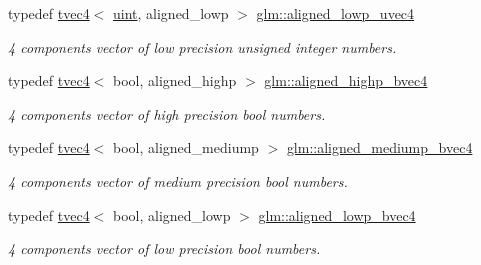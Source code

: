 \begin{DoxyCompactItemize}
\mbox{\label{group__gtc__type__aligned_gaddd52f9fd4fe29220ad183043a7d1ddd}} 
typedef \hyperlink{structglm_1_1tvec4}{tvec4}$<$ \hyperlink{group__core__precision_ga4fd29415871152bfb5abd588334147c8}{uint}, aligned\+\_\+lowp $>$ \hyperlink{group__gtc__type__aligned_gaddd52f9fd4fe29220ad183043a7d1ddd}{glm\+::aligned\+\_\+lowp\+\_\+uvec4}
\begin{DoxyCompactList}\small\item\em 4 components vector of low precision unsigned integer numbers. \end{DoxyCompactList}\item 
\mbox{\label{group__gtc__type__aligned_ga2e41bbaacd4df8babd91b4e2f21cb8dd}} 
typedef \hyperlink{structglm_1_1tvec4}{tvec4}$<$ bool, aligned\+\_\+highp $>$ \hyperlink{group__gtc__type__aligned_ga2e41bbaacd4df8babd91b4e2f21cb8dd}{glm\+::aligned\+\_\+highp\+\_\+bvec4}
\begin{DoxyCompactList}\small\item\em 4 components vector of high precision bool numbers. \end{DoxyCompactList}\item 
\mbox{\label{group__gtc__type__aligned_ga2125d53e043f27687b7a40d14bd05ca0}} 
typedef \hyperlink{structglm_1_1tvec4}{tvec4}$<$ bool, aligned\+\_\+mediump $>$ \hyperlink{group__gtc__type__aligned_ga2125d53e043f27687b7a40d14bd05ca0}{glm\+::aligned\+\_\+mediump\+\_\+bvec4}
\begin{DoxyCompactList}\small\item\em 4 components vector of medium precision bool numbers. \end{DoxyCompactList}\item 
\mbox{\label{group__gtc__type__aligned_ga9de756b9d2ebdf5495b5d1477d124571}} 
typedef \hyperlink{structglm_1_1tvec4}{tvec4}$<$ bool, aligned\+\_\+lowp $>$ \hyperlink{group__gtc__type__aligned_ga9de756b9d2ebdf5495b5d1477d124571}{glm\+::aligned\+\_\+lowp\+\_\+bvec4}
\begin{DoxyCompactList}\small\item\em 4 components vector of low precision bool numbers. \end{DoxyCompactList}\item 
\mbox{\label{group__gtc__type__aligned_ga8cf75c112dfa39264b7ef65c2ed6b3c4}} 

\end{DoxyCompactItemize}
